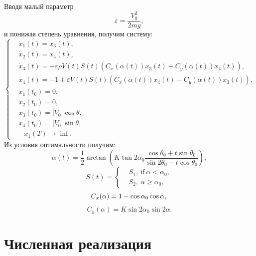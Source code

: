 \documentclass{article}
\begin{document}
Вводя малый параметр
\[ \varepsilon = \frac{V_0^2}{2mg}, \]
и понижая степень уравнения, получим систему:
\begin{equation}
  \left\{
    \begin{aligned}
      & \dot x_1(t) = x_3(t),\\
      & \dot x_2(t) = x_4(t),\\
      & \dot x_3(t) = -\varepsilon\rho V(t)S(t) (C_x(\alpha(t)) x_3(t) + C_y(\alpha(t)) x_4(t)),\\
      & \dot x_4(t) = -1 + \varepsilon V(t)S(t) (C_x(\alpha(t)) x_4(t) - C_y(\alpha(t)) x_3(t)),\\
      & x_1(t_0) = 0,\\
      & x_2(t_0) = 0,\\
      & x_3(t_0) = |V_0|\cos\theta,\\
      & x_4(t_0) = |V_0|\sin\theta,\\
      & -x_1(T) \to\inf.
    \end{aligned}
  \right.
\end{equation}
Из условия оптимальности получим:
\[
  \alpha(t) = \frac12 \arctan(K\tan2\alpha_0\frac{\cos\theta_0 +
    t\sin\theta_0}{\sin2\theta_0 - t\cos\theta_0}),
\]
\[
  S(t) = \left\{ \begin{aligned}
      & S_1,\ \text{if}\ \alpha < \alpha_0,\\
      & S_2,\ \alpha\geq\alpha_0,
    \end{aligned} \right.
\]
\[
  C_x(\alpha) = 1 - \cos\alpha_0\cos\alpha,\\
\]
\[
  C_y(\alpha) = K\sin2\alpha_0\sin2\alpha.
\]

\section{Численная реализация}
\end{document}

